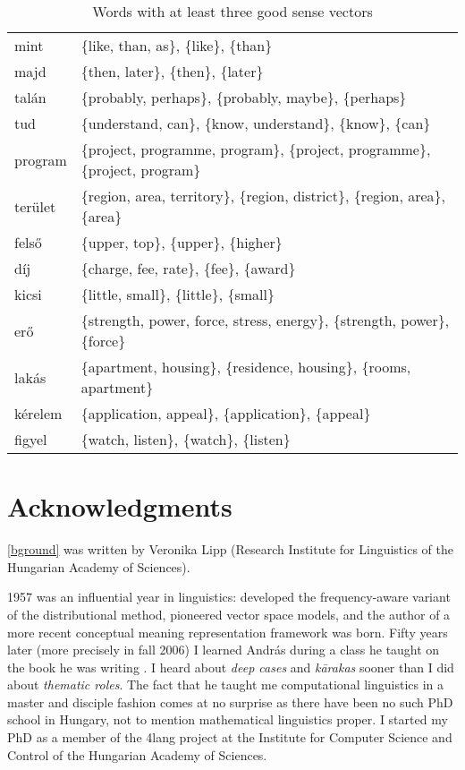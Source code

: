 \documentclass[11pt]{article}
\begin{document}
\begin{table} \footnotesize
  \begin{tabular}{ll}
    \toprule
mint	& \{like, than, as\}, \{like\}, \{than\}	\\
majd	& \{then, later\}, \{then\}, \{later\}	\\
talán	& \{probably, perhaps\}, \{probably, maybe\}, \{perhaps\}	\\
tud	& \{understand, can\}, \{know, understand\}, \{know\}, \{can\}	\\
program	& \{project, programme, program\}, \{project, programme\}, \{project, program\}	\\
terület	& \{region, area, territory\}, \{region, district\}, \{region, area\}, \{area\}	\\
felső	& \{upper, top\}, \{upper\}, \{higher\}	\\
díj	& \{charge, fee, rate\}, \{fee\}, \{award\}	\\
kicsi	& \{little, small\}, \{little\}, \{small\}	\\
erő	& \{strength, power, force, stress, energy\}, \{strength, power\}, \{force\}	\\
lakás	& \{apartment, housing\}, \{residence, housing\}, \{rooms, apartment\}	\\
kérelem	& \{application, appeal\}, \{application\}, \{appeal\}	\\
figyel	& \{watch, listen\}, \{watch\}, \{listen\}	\\
\bottomrule
\end{tabular}
  \caption{Words with at least three good sense vectors}
  \label{tab:like_than} 
\end{table}

\section{Acknowledgments}

\autoref{bground} was written by Veronika Lipp (Research Institute for
Linguistics of the Hungarian Academy of Sciences).  

1957 was an influential year in linguistics: \cite{Harris:1957} developed the
frequency-aware variant of the distributional method, \cite{Osgood:1957}
pioneered vector space models, and the author of a more recent conceptual
meaning representation framework \citep{Kornai:2010,Kornai:2017} was born.
Fifty years later (more precisely in fall 2006) I learned András during a class
he taught on the book he was writing \citep{Kornai:2007}. I heard about
\emph{deep cases} and \emph{k\={a}rakas} sooner than I did about \emph{thematic
roles}. The fact that he taught me computational linguistics in a master and
disciple fashion comes at no surprise as there have been no such PhD school in
Hungary, not to mention mathematical linguistics proper.  
I started my PhD as a member of the 4lang project at the Institute for Computer
Science and Control of the Hungarian Academy of Sciences. 
\end{document}

